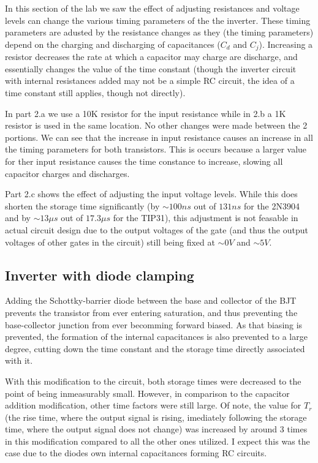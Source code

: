 \documentclass[10pt]{article}
\begin{document}
In this section of the lab we saw the effect of adjusting resistances and
voltage levels can change the various timing parameters of the the
inverter. These timing parameters are adusted by the resistance changes as
they (the timing parameters) depend on the charging and discharging of
capacitances ($C_d$ and $C_j$). Increasing a resistor decreases the rate
at which a capacitor may charge are discharge, and essentially changes the
value of the time constant (though the inverter circuit with internal
resistances added may not be a simple RC circuit, the idea of a time
constant still applies, though not directly). 

In part 2.a we use a 10K resistor for the input resistance while in 2.b a
1K resistor is used in the same location. No other changes were made
between the 2 portions. We can see that the increase in input resistance
causes an increase in all the timing parameters for both transistors. This
is occurs because a larger value for ther input resistance causes the time
constance to increase, slowing all capacitor charges and discharges.

Part 2.c shows the effect of adjusting the input voltage levels. While
this does shorten the storage time significantly (by $\sim100ns$ out of
$131ns$ for the 2N3904 and by $\sim13\mu s$ out of $17.3\mu s$ for the
TIP31), this adjustment is not feasable in actual circuit design due to
the output voltages of the gate (and thus the output voltages of other
gates in the circuit) still being fixed at $\sim0V$ and $\sim5V$.

\subsection{Inverter with diode clamping}

Adding the Schottky-barrier diode between the base and collector of the
BJT prevents the transistor from ever entering saturation, and thus
preventing the base-collector junction from ever becomming forward biased.
As that biasing is prevented, the formation of the internal capacitances
is also prevented to a large degree, cutting down the time constant and
the storage time directly associated with it.

With this modification to the circuit, both storage times were decreased
to the point of being inmeasurably small. However, in comparison to the
capacitor addition modification, other time factors were still large. Of
note, the value for $T_r$ (the rise time, where the output signal is
rising, imediately following the storage time, where the output signal
does not change) was increased by around 3 times in this modification
compared to all the other ones utilized. I expect this was the case due to
the diodes own internal capacitances forming RC circuits.
\end{document}
